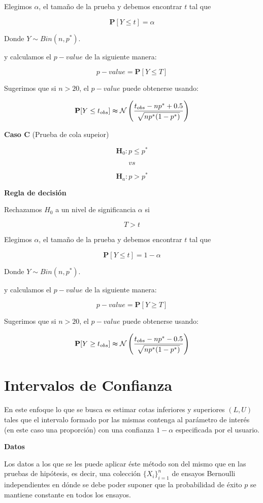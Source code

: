 \documentclass[
  a4paper,
  oneside,
  openany]{book}
\begin{document}
Elegimos \(\alpha\), el tamaño de la prueba y debemos encontrar \(t\) tal que

\[\mathbf{P}[Y \leq t]=\alpha\]

Donde \(Y \sim Bin (n,p^*)\).

y calculamos el \(p-value\) de la siguiente manera:

\[p-value= \mathbf{P}[Y\leq T]\]

Sugerimos que si \(n > 20\), el \(p-value\) puede obtenerse usando:

\[\mathbf{P}[Y\leq t_{obs}] \thickapprox \mathcal{N} \left(\frac{t_{obs}-np^*+0.5}{\sqrt{np^*(1-p^*)}}\right)\]

\textbf{Caso C} (Prueba de cola supeior)

\[\textbf{H}_{0}: p  \leq p^*\]

\[vs\]

\[\textbf{H}_{a}: p >p^*\]

\textbf{Regla de decisión}

Rechazamos \(H_0\) a un nivel de significancia \(\alpha\) si

\[T > t\]

Elegimos \(\alpha\), el tamaño de la prueba y debemos encontrar \(t\) tal que

\[\mathbf{P}[Y \leq t]=1-\alpha\]

Donde \(Y \sim Bin (n,p^*)\).

y calculamos el \(p-value\) de la siguiente manera:

\[p-value= \mathbf{P}[Y \geq T]\]

Sugerimos que si \(n > 20\), el \(p-value\) puede obtenerse usando:

\[\mathbf{P}[Y\geq t_{obs}] \thickapprox \mathcal{N} \left(\frac{t_{obs}-np^*-0.5}{\sqrt{np^*(1-p^*)}}\right)\]

\hypertarget{intervalos-de-confianza}{%
\section{Intervalos de Confianza}\label{intervalos-de-confianza}}

En este enfoque lo que se busca es estimar cotas inferiores y superiores \((L,U)\) tales que el intervalo formado por las mismas contenga al parámetro de interés (en este caso una proporción) con una confianza \(1-\alpha\) especificada por el usuario.

\textbf{Datos}

Los datos a los que se les puede aplicar éste método son del mismo que en las pruebas de hipótesis, es decir, una colección \(\{X_{i}\}_{i=1}^n\) de ensayos Bernoulli independientes en dónde se debe poder suponer que la probabilidad de éxito \(p\) se mantiene constante en todos los ensayos.
\end{document}
